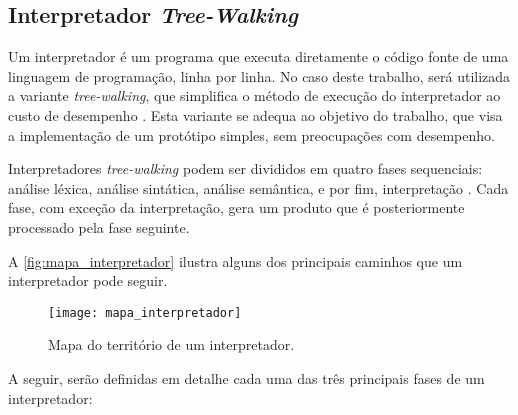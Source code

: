 \subsection{Interpretador \textit{Tree-Walking}}

Um interpretador é um programa que executa diretamente o código fonte de uma linguagem de programação, linha por linha. No caso deste trabalho, será utilizada a variante \textit{tree-walking}, que simplifica o método de execução do interpretador ao custo de desempenho \cite{craftinginterpreters}. Esta variante se adequa ao objetivo do trabalho, que visa a implementação de um protótipo simples, sem preocupações com desempenho.

Interpretadores \textit{tree-walking} podem ser divididos em quatro fases sequenciais: análise léxica, análise sintática, análise semântica, e por fim, interpretação \cite{craftinginterpreters}. Cada fase, com exceção da interpretação, gera um produto que é posteriormente processado pela fase seguinte.

A \autoref{fig:mapa_interpretador} ilustra alguns dos principais caminhos que um interpretador pode seguir.

\begin{figure}[H]
	\centering
	\texttt{[image: mapa\_interpretador]}
	\caption{Mapa do território de um interpretador.}
	\label{fig:mapa_interpretador}
\end{figure}

A seguir, serão definidas em detalhe cada uma das três principais fases de um interpretador:

